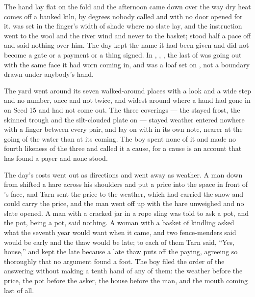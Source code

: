 The hand lay flat on the fold and the afternoon came down over  the way dry heat comes off a banked kiln, by degrees nobody called and with no door opened for it.  was set in the finger's width of shade where no slate lay, and the instruction went to the wool and the river wind and never to the basket;  stood half a pace off and said nothing over him. The day kept the name it had been given and did not become a gate or a payment or a thing signed. In , , , the last of  was going out with the same face it had worn coming in, and  was a loaf set on , not a boundary drawn under anybody's hand.

The yard went around its seven walked-around places with a look and a wide step and no number, once and not twice, and widest around  where a hand had gone in on Seed 15 and had not come out. The three coverings --- the stayed frost, the skinned trough and the silt-clouded plate on  --- stayed weather entered nowhere with a finger between every pair, and  lay on  with  in its own note, nearer at the going of the water than at its coming. The boy spent none of it and made no fourth likeness of the three and called it a cause, for a cause is an account that has found a payer and none stood.

The day's costs went out as directions and went away as weather. A man down from  shifted a hare across his shoulders and put a price into the space in front of 's face, and Tarn sent the price to the weather, which had carried the snow and could carry the price, and the man went off up  with the hare unweighed and no slate opened. A man with a cracked jar in a rope sling was told to ask a pot, and the pot, being a pot, said nothing. A woman with a basket of kindling asked what the seventh year would want when it came, and two fence-menders said  would be early and the thaw would be late; to each of them Tarn said, “Yes, house,” and kept the late because a late thaw puts off the paying, agreeing so thoroughly that no argument found a foot. The boy filed the order of the answering without making a tenth hand of any of them: the weather before the price, the pot before the asker, the house before the man, and the mouth coming last of all.

